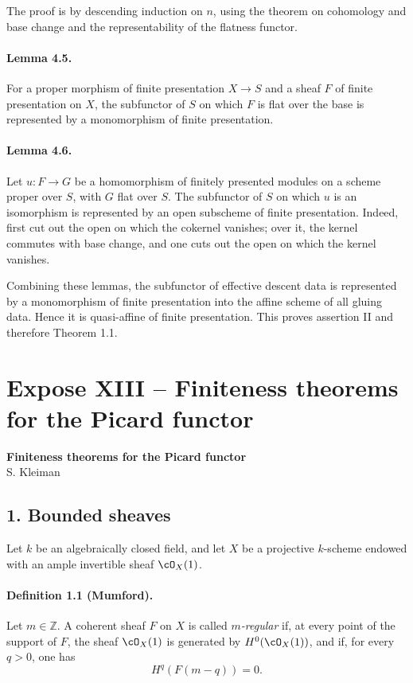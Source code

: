 \documentclass[11pt]{article}
\theoremstyle{plain}
\theoremstyle{definition}
\theoremstyle{remark}
\newcommand{\ZZ}{\mathbb Z}
\begin{document}
The proof is by descending induction on $n$, using the theorem on cohomology and base change and the representability of the flatness functor.

\paragraph{Lemma 4.5.}
For a proper morphism of finite presentation $X\to S$ and a sheaf $F$ of finite presentation on $X$, the subfunctor of $S$ on which $F$ is flat over the base is represented by a monomorphism of finite presentation.

\paragraph{Lemma 4.6.}
Let $u:F\to G$ be a homomorphism of finitely presented modules on a scheme proper over $S$, with $G$ flat over $S$. The subfunctor of $S$ on which $u$ is an isomorphism is represented by an open subscheme of finite presentation. Indeed, first cut out the open on which the cokernel vanishes; over it, the kernel commutes with base change, and one cuts out the open on which the kernel vanishes.

Combining these lemmas, the subfunctor of effective descent data is represented by a monomorphism of finite presentation into the affine scheme of all gluing data. Hence it is quasi-affine of finite presentation. This proves assertion II and therefore Theorem 1.1.

\section*{Expose XIII -- Finiteness theorems for the Picard functor}

\begin{center}
{\large\textbf{Finiteness theorems for the Picard functor}}\\[0.25em]
{\normalsize S. Kleiman}
\end{center}

\subsection*{1. Bounded sheaves}

Let $k$ be an algebraically closed field, and let $X$ be a projective $k$-scheme endowed with an ample invertible sheaf $\cO_X(1)$.

\paragraph{Definition 1.1 (Mumford).}
Let $m\in\ZZ$. A coherent sheaf $F$ on $X$ is called \emph{$m$-regular} if, at every point of the support of $F$, the sheaf $\cO_X(1)$ is generated by $H^0(\cO_X(1))$, and if, for every $q>0$, one has
\[
H^q(F(m-q))=0.
\]
\end{document}
